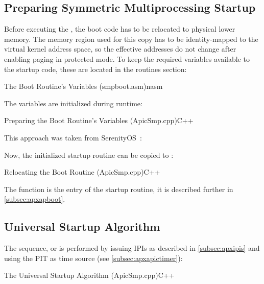 \subsection{Preparing Symmetric Multiprocessing Startup}
\label{subsec:apxpreparesmp}

Before executing the , the boot code has to be relocated to physical lower memory.
The memory region used for this copy has to be identity-mapped to the virtual kernel address space, so the effective addresses do not change after enabling paging in protected mode.
To keep the required variables available to the startup code, these are located in the routines  section:

\begin{codeblock}{The Boot Routine's Variables (smp\textunderscore{}boot.asm)}{nasm}
\end{codeblock}

The variables are initialized during runtime:

\begin{codeblock}{Preparing the Boot Routine's Variables (ApicSmp.cpp)}{C++}
\end{codeblock}

This approach was taken from SerenityOS~\autocite[APIC.cpp]{serenity}:

Now, the initialized startup routine can be copied to :

\begin{codeblock}{Relocating the Boot Routine (ApicSmp.cpp)}{C++}
\end{codeblock}

The  function is the entry of the startup routine, it is described further in \autoref{subsec:apxapboot}.

\subsection{Universal Startup Algorithm}
\label{subsec:apxmpusa}

The  sequence, or  is performed by issuing IPIs as described in \autoref{subsec:apxipis} and using the PIT as time source (see \autoref{subsec:apxapictimer}):

\begin{codeblock}{The Universal Startup Algorithm (ApicSmp.cpp)}{C++}
\end{codeblock}

